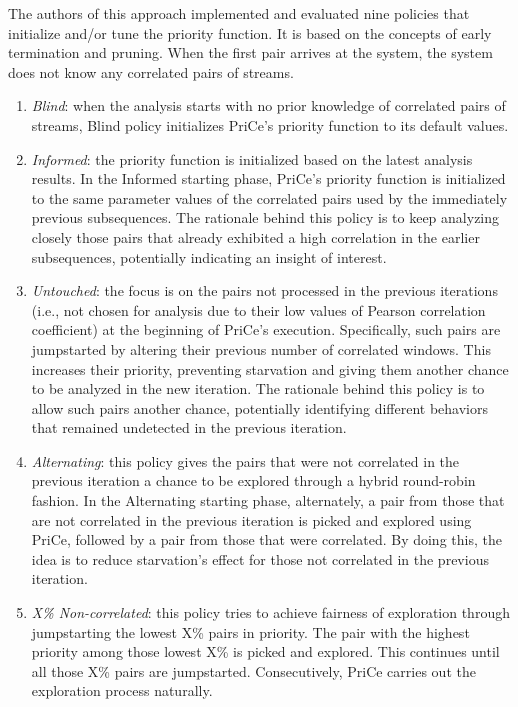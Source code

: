 The authors of this approach implemented and evaluated nine policies that initialize and/or tune the priority function. It is based on the concepts of early termination and pruning. When the first pair arrives at the system, the system does not know any correlated pairs of streams.
\begin{enumerate}
\item \textit{Blind}: when the analysis starts with no prior knowledge of correlated pairs of streams, Blind policy initializes PriCe's priority function to its default values.
\item \textit{Informed}: the priority function is initialized based on the latest analysis results. In the Informed starting phase, PriCe’s priority function is initialized to the same parameter values of the correlated pairs used by the immediately previous subsequences. The rationale behind this policy is to keep analyzing closely those pairs that already exhibited a high correlation in the earlier subsequences, potentially indicating an insight of interest.
\item \textit{Untouched}: the focus is on the pairs not processed in the previous iterations (i.e., not chosen for analysis due to their low values of Pearson correlation coefficient) at the beginning of PriCe's execution. Specifically, such pairs are jumpstarted by altering their previous number of correlated windows. This increases their priority, preventing starvation and giving them another chance to be analyzed in the new iteration. The rationale behind this policy is to allow such pairs another chance, potentially identifying different behaviors that remained undetected in the previous iteration.
\item \textit{Alternating}: this policy gives the pairs that were not correlated in the previous iteration a chance to be explored through a hybrid round-robin fashion. In the Alternating starting phase, alternately, a pair from those that are not correlated in the previous iteration is picked and explored using PriCe, followed by a pair from those that were correlated. By doing this, the idea is to reduce starvation's effect for those not correlated in the previous iteration.
\item \textit{X\% Non-correlated}: this policy tries to achieve fairness of exploration through jumpstarting the lowest X\% pairs in priority. The pair with the highest priority among those lowest X\% is picked and explored. This continues until all those X\% pairs are jumpstarted. Consecutively, PriCe carries out the exploration process naturally.

\end{enumerate}
